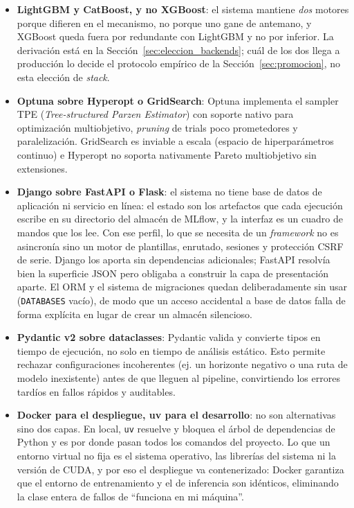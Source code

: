 \begin{itemize}
    \item \textbf{LightGBM y CatBoost, y no XGBoost}: el sistema mantiene \emph{dos} motores porque difieren en el mecanismo, no porque uno gane de antemano, y XGBoost queda fuera por redundante con LightGBM y no por inferior. La derivación está en la Sección~\ref{sec:eleccion_backends}; cuál de los dos llega a producción lo decide el protocolo empírico de la Sección~\ref{sec:promocion}, no esta elección de \textit{stack}.

    \item \begin{sloppypar}\textbf{Optuna sobre Hyperopt o GridSearch}: Optuna implementa el sampler TPE (\textit{Tree-structured Parzen Estimator}) con soporte nativo para optimización multi\-objetivo, \textit{pruning} de trials poco prometedores y paralelización. GridSearch es inviable a escala (espacio de hiperparámetros continuo) e Hyperopt no soporta nativamente Pareto multi\-objetivo sin extensiones.\end{sloppypar}

    \item \textbf{Django sobre FastAPI o Flask}: el sistema no tiene base de datos de aplicación ni servicio en línea: el estado son los artefactos que cada ejecución escribe en su directorio del almacén de MLflow, y la interfaz es un cuadro de mandos que los lee. Con ese perfil, lo que se necesita de un \textit{framework} no es asincronía sino un motor de plantillas, enrutado, sesiones y protección CSRF de serie. Django los aporta sin dependencias adicionales; FastAPI resolvía bien la superficie JSON pero obligaba a construir la capa de presentación aparte. El ORM y el sistema de migraciones quedan deliberadamente sin usar (\texttt{DATABASES} vacío), de modo que un acceso accidental a base de datos falla de forma explícita en lugar de crear un almacén silencioso.

    \item \textbf{Pydantic v2 sobre dataclasses}: Pydantic valida y convierte tipos en tiempo de ejecución, no solo en tiempo de análisis estático. Esto permite rechazar configuraciones incoherentes (ej. un horizonte negativo o una ruta de modelo inexistente) antes de que lleguen al pipeline, convirtiendo los errores tardíos en fallos rápidos y auditables.

    \item \textbf{Docker para el despliegue, uv para el desarrollo}: no son alternativas sino dos capas. En local, \texttt{uv} resuelve y bloquea el árbol de dependencias de Python y es por donde pasan todos los comandos del proyecto. Lo que un entorno virtual no fija es el sistema operativo, las librerías del sistema ni la versión de CUDA, y por eso el despliegue va contenerizado: Docker garantiza que el entorno de entrenamiento y el de inferencia son idénticos, eliminando la clase entera de fallos de ``funciona en mi máquina''.


\end{itemize}
